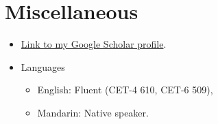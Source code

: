 \documentclass{resume}
\begin{document}
\section{Miscellaneous}
\begin{itemize}
  \item \href{https://scholar.google.com/citations?user=-TaP8h4AAAAJ&hl=zh-CN}{Link to my Google Scholar profile}.
  \item Languages
  \begin{itemize}
    \item English: Fluent (CET-4 610, CET-6 509),
    \item Mandarin: Native speaker.
  \end{itemize}
\end{itemize}

%
%
\end{document}
